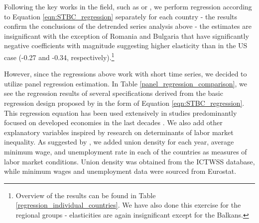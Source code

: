 \documentclass[11pt]{article}
\begin{document}
Following the key works in the field, such as \citet{katz1992changes} or \citet{acemoglu2012does}, we perform regression according to Equation \ref{eqn:STBC_regression} separately for each country - the results confirm the conclusions of the detrended series analysis above - the estimates are insignificant with the exception of Romania and Bulgaria that have significantly negative coefficients with magnitude suggesting higher elasticity than in the US case (-0.27 and -0.34, respectively).\footnote{Overview of the results can be found in Table \ref{regression_individual_countries}. We have also done this exercise for the regional groups - elasticities are again insignificant except for the Balkans.}

However, since the regressions above work with short time series, we decided to utilize panel regression estimation. In Table \ref{panel_regression_comparison}, we see the regression results of several specifications derived from the basic regression design proposed by \citet{katz1992changes} in the form of Equation \ref{eqn:STBC_regression}. This regression equation has been used extensively in studies predominantly focused on developed economies in the last decades \citep{havranek2020elasticity}. We also add other explanatory variables inspired by research on determinants of labor market inequality. As suggested by \citet{farber2021unions}, we added union density for each year, average minimum wage, and unemployment rate in each of the countries as measures of labor market conditions. Union density was obtained from the ICTWSS database, while minimum wages and unemployment data were sourced from Eurostat. %
\end{document}
